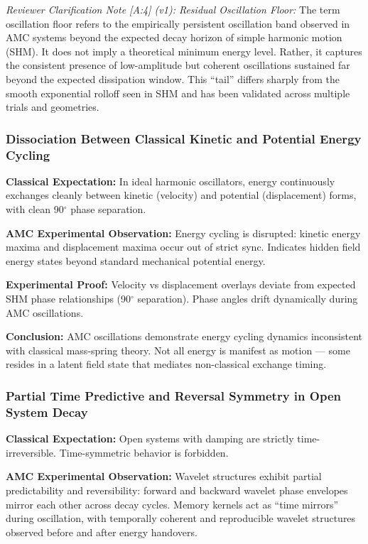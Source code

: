 \documentclass[10pt,aps,pre,onecolumn,superscriptaddress,notitlepage]{revtex4-2}
\begin{document}
\noindent \textit{Reviewer Clarification Note [A:4] (v1): Residual Oscillation Floor:} The term oscillation floor refers to the empirically persistent oscillation band observed in AMC systems beyond the expected decay horizon of simple harmonic motion (SHM). It does not imply a theoretical minimum energy level. Rather, it captures the consistent presence of low-amplitude but coherent oscillations sustained far beyond the expected dissipation window. This ``tail'' differs sharply from the smooth exponential rolloff seen in SHM and has been validated across multiple trials and geometries.

\subsubsection{Dissociation Between Classical Kinetic and Potential Energy Cycling}
\label{sec:dev5DissociationBetweenClassical}

\textbf{Classical Expectation:} In ideal harmonic oscillators, energy continuously exchanges cleanly between kinetic (velocity) and potential (displacement) forms, with clean 90$^\circ$ phase separation.

\textbf{AMC Experimental Observation:} Energy cycling is disrupted: kinetic energy maxima and displacement maxima occur out of strict sync. Indicates hidden field energy states beyond standard mechanical potential energy.

\textbf{Experimental Proof:} Velocity vs displacement overlays deviate from expected SHM phase relationships (90$^\circ$ separation). Phase angles drift dynamically during AMC oscillations.

\textbf{Conclusion:} AMC oscillations demonstrate energy cycling dynamics inconsistent with classical mass-spring theory. Not all energy is manifest as motion — some resides in a latent field state that mediates non-classical exchange timing.

\subsubsection{Partial Time Predictive and Reversal Symmetry in Open System Decay}
\label{sec:dev6PartialTimePredictiveandReversalSymmetry}

\textbf{Classical Expectation:} Open systems with damping are strictly time-irreversible. Time-symmetric behavior is forbidden.

\textbf{AMC Experimental Observation:} Wavelet structures exhibit partial predictability and reversibility: forward and backward wavelet phase envelopes mirror each other across decay cycles. Memory kernels act as ``time mirrors'' during oscillation, with temporally coherent and reproducible wavelet structures observed before and after energy handovers.
\end{document}
